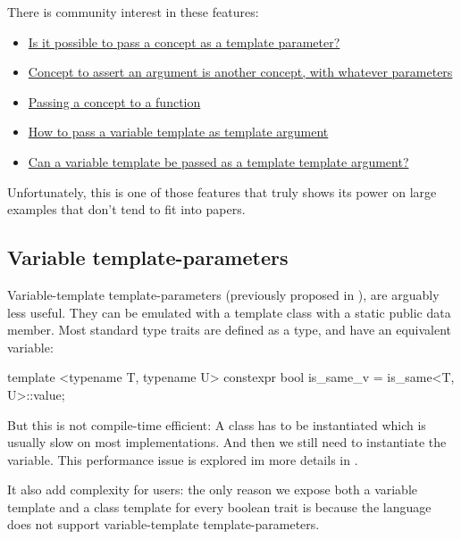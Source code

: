 \documentclass{wg21}
\begin{document}
There is community interest in these features:

\begin{itemize}
\item \href{https://stackoverflow.com/questions/63098070/is-it-possible-to-pass-a-concept-as-a-template-parameter}{Is it possible to pass a concept as a template parameter?}
\item \href{https://stackoverflow.com/questions/72488554/concept-to-assert-an-argument-is-another-concept-with-whatever-parameters}{Concept to assert an argument is another concept, with whatever parameters}
\item \href{https://stackoverflow.com/questions/58875829/passing-a-concept-to-a-function}{Passing a concept to a function}
\item \href{https://stackoverflow.com/questions/61664468/how-to-pass-a-variable-template-as-template-argument}{How to pass a variable template as template argument}
\item \href{https://stackoverflow.com/questions/58592312/can-a-variable-template-be-passed-as-a-template-template-argument}{Can a variable template be passed as a template template argument?}
\end{itemize}

Unfortunately, this is one of those features that truly shows its power on large examples that don't tend to fit into papers.


\subsection{Variable template-parameters}

Variable-template template-parameters (previously proposed in ), are arguably less useful.
They can be emulated with a template class with a static public  data member.
Most standard type traits are defined as a type, and have an equivalent  variable:
\begin{colorblock}
template <typename T, typename U>
constexpr bool is_same_v = is_same<T, U>::value;
\end{colorblock}

But this is not compile-time efficient: A class has to be instantiated which is usually slow on most implementations.
And then we still need to instantiate the variable. This performance issue is explored  im more details in .

It also add complexity for users: the only reason we expose both a variable template and a class template for every boolean trait is because the language
does not support variable-template template-parameters.
\end{document}
